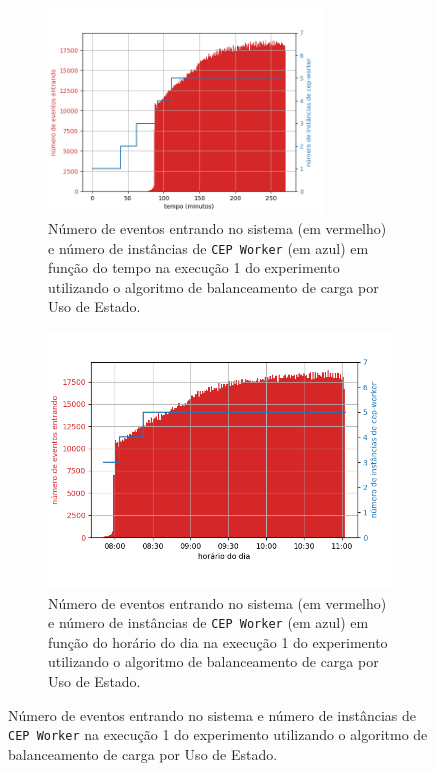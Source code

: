 \begin{figure}[h]
\centering
\vspace{5cm}
\begin{subfigure}{0.9\textwidth}
\centering
\includegraphics[width=0.8\textwidth]{figuras/graphics/carga_e_workers_total5-dez-su.png}
\caption{Número de eventos entrando no sistema (em vermelho) e número de instâncias de \texttt{CEP Worker} (em azul) em função do tempo na execução 1 do experimento utilizando o algoritmo de balanceamento de carga por Uso de Estado.}
\label{fig:workers_and_load_total}
\end{subfigure}%

\begin{subfigure}{\textwidth}
\centering
\includegraphics[width=\textwidth]{figuras/graphics/carga_e_workers_horario5-dez-su.png}
\caption{Número de eventos entrando no sistema (em vermelho) e número de instâncias de \texttt{CEP Worker} (em azul) em função do horário do dia na execução 1 do experimento utilizando o algoritmo de balanceamento de carga por Uso de Estado.}
\label{fig:workers_and_load_SPtrans}
\end{subfigure}%
\caption{Número de eventos entrando no sistema e número de instâncias de \texttt{CEP Worker} na execução 1 do experimento utilizando o algoritmo de balanceamento de carga por Uso de Estado.}
\end{figure}

